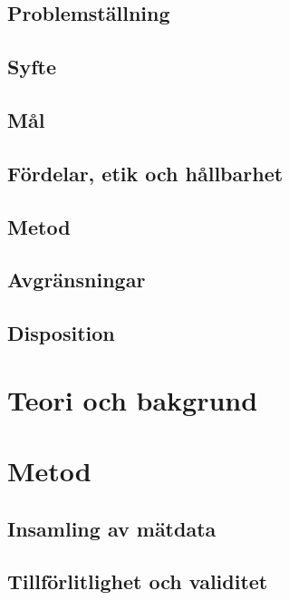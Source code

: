 \subsection{Problemställning}

\subsection{Syfte}

\subsection{Mål}

\subsection{Fördelar, etik och hållbarhet}

\subsection{Metod}

\subsection{Avgränsningar}

\subsection{Disposition}

\clearpage
\section{Teori och bakgrund}

\clearpage
\section{Metod}

\subsection{Insamling av mätdata}
\subsection{Tillförlitlighet och validitet}

\clearpage
